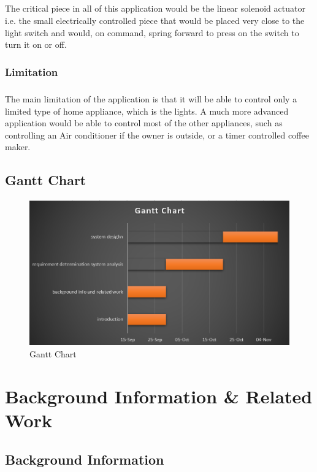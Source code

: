 \documentclass[a4paper, 12pt, oneside]{book}
\begin{document}
				\paragraph{} The critical piece in all of this application would be the linear solenoid actuator i.e. the small electrically controlled piece that would be placed very close to the light switch and would, on command, spring forward to press on the switch to turn it on or off. 
			\subsection{Limitation}
			\paragraph{} The main limitation of the application is that it will be able to control only a limited type of home appliance, which is the lights. A much more advanced application would be able to control most of the other appliances, such as controlling an Air conditioner if the owner is outside, or a timer controlled coffee maker.
			
		\section{Gantt Chart}
		\begin{figure}[h!]
  			\caption{Gantt Chart}
			\includegraphics[width=\linewidth]{img/gantt_chart.png}
		\end{figure}
		\newpage	
		\chapter{Background Information \& Related Work}
			\section{Background Information}
\end{document}
